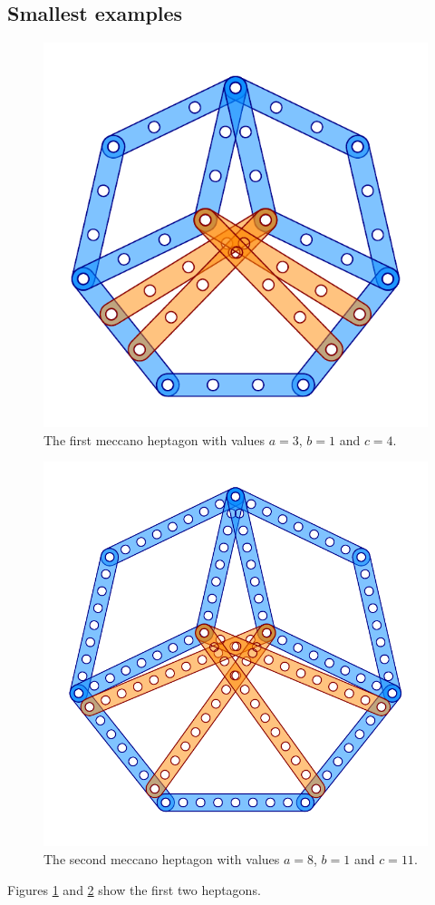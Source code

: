 \documentclass[11pt]{article}
\begin{document}
\subsection{Smallest examples}

\begin{figure}[htp]
\centering
\includegraphics[scale=1]{figs/heptagon-3}
\caption{The first meccano heptagon with values $a=3$, $b=1$ and $c=4$.}
\label{heptagon-3}
\end{figure}

\begin{figure}[htp]
\centering
\includegraphics[scale=1]{figs/heptagon-8}
\caption{The second meccano heptagon with values $a=8$, $b=1$ and $c=11$.}
\label{heptagon-8}
\end{figure}

Figures \ref{heptagon-3} and \ref{heptagon-8} show the first two heptagons.
\end{document}
